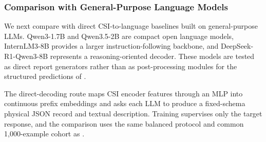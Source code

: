 \subsubsection{Comparison with General-Purpose Language Models}

We next compare with direct CSI-to-language baselines built on general-purpose LLMs. Qwen3-1.7B and
Qwen3.5-2B are compact open language models, InternLM3-8B provides a larger instruction-following
backbone, and DeepSeek-R1-Qwen3-8B represents a reasoning-oriented decoder. These models are tested
as direct report generators rather than as post-processing modules for the structured predictions of
\model{}.

The direct-decoding route maps CSI encoder features through an MLP into continuous prefix embeddings
and asks each LLM to produce a fixed-schema physical JSON record and textual description. Training
supervises only the target response, and the comparison uses the same balanced protocol and common
1,000-example cohort as \model{}.

